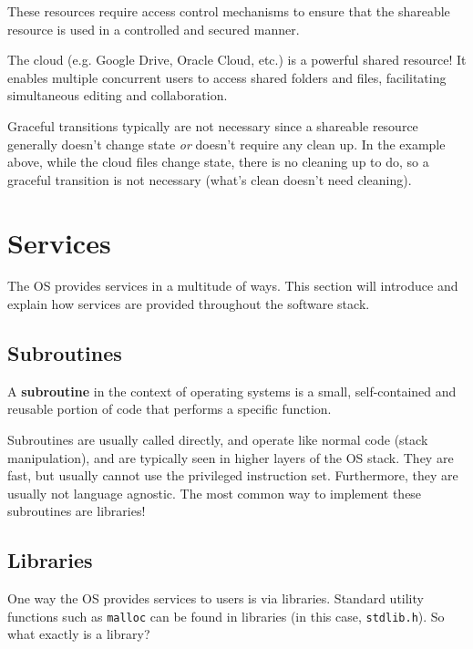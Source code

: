 \documentclass{report}
\begin{document}
These resources require access control mechanisms to ensure that the shareable resource is used in a
controlled and secured manner.

\begin{tcolorbox}[colback=blue!5!white,colframe=black!75!blue,title=Example: Cloud Crazy] 
  The cloud (e.g. Google Drive, Oracle Cloud, etc.) is a powerful shared resource! It enables
  multiple concurrent users to access shared folders and files, facilitating simultaneous editing
  and collaboration.
\end{tcolorbox}

Graceful transitions typically are not necessary since a shareable resource generally doesn't change
state \textit{or} doesn't require any clean up. In the example above, while the cloud files change
state, there is no cleaning up to do, so a graceful transition is not necessary (what's clean
doesn't need cleaning).










\chapter{Services}
The OS provides services in a multitude of ways. This section will introduce and explain how
services are provided throughout the software stack.





\section{Subroutines}
\begin{tcolorbox}[title=Definition: Subroutine]
  A \textbf{subroutine} in the context of operating systems is a small, self-contained and reusable
  portion of code that performs a specific function.
\end{tcolorbox}

Subroutines are usually called directly, and operate like normal code (stack manipulation), and are
typically seen in higher layers of the OS stack. They are fast, but usually cannot use the
privileged instruction set. Furthermore, they are usually not language agnostic. The most common way
to implement these subroutines are libraries!





\section{Libraries}
One way the OS provides services to users is via libraries. Standard utility functions such as
\texttt{malloc} can be found in libraries (in this case, \texttt{stdlib.h}). So what exactly is a
library?
\end{document}
